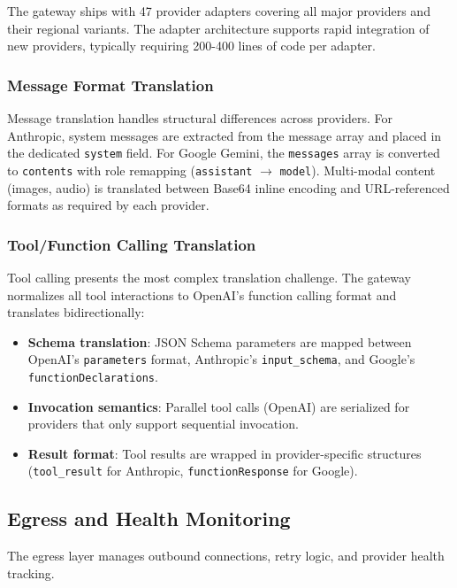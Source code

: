 \documentclass[11pt,twocolumn]{article}
\begin{document}
The gateway ships with 47 provider adapters covering all major providers and their regional variants. The adapter architecture supports rapid integration of new providers, typically requiring 200-400 lines of code per adapter.

\subsubsection{Message Format Translation}

Message translation handles structural differences across providers. For Anthropic, system messages are extracted from the message array and placed in the dedicated \texttt{system} field. For Google Gemini, the \texttt{messages} array is converted to \texttt{contents} with role remapping (\texttt{assistant} $\rightarrow$ \texttt{model}). Multi-modal content (images, audio) is translated between Base64 inline encoding and URL-referenced formats as required by each provider.

\subsubsection{Tool/Function Calling Translation}

Tool calling presents the most complex translation challenge. The gateway normalizes all tool interactions to OpenAI's function calling format and translates bidirectionally:

\begin{itemize}[leftmargin=*]
    \item \textbf{Schema translation}: JSON Schema parameters are mapped between OpenAI's \texttt{parameters} format, Anthropic's \texttt{input\_schema}, and Google's \texttt{functionDeclarations}.
    \item \textbf{Invocation semantics}: Parallel tool calls (OpenAI) are serialized for providers that only support sequential invocation.
    \item \textbf{Result format}: Tool results are wrapped in provider-specific structures (\texttt{tool\_result} for Anthropic, \texttt{functionResponse} for Google).
\end{itemize}

\subsection{Egress and Health Monitoring}

The egress layer manages outbound connections, retry logic, and provider health tracking.
\end{document}
